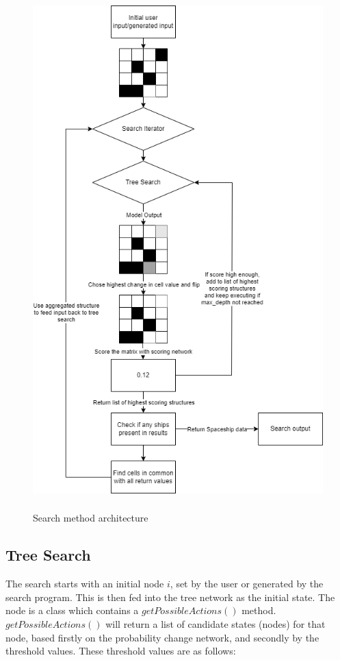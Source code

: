 \documentclass{l4proj}
\begin{document}
\begin{figure}[h!]
\centering
\includegraphics[width=0.9\linewidth, height=20cm]{dissertation/images/diagrams/gol_search_structure.png}
\caption{Search method architecture}
\label{fig:subim1}
\end{figure}

\subsection{Tree Search}

The search starts with an initial node $i$, set by the user or generated by the search program. This is then fed into the tree network as the initial state. The node is a class which contains a $getPossibleActions()$ method. $getPossibleActions()$ will return a list of candidate states (nodes) for that node, based firstly on the probability change network, and secondly by the threshold values. These threshold values are as follows:
\end{document}
